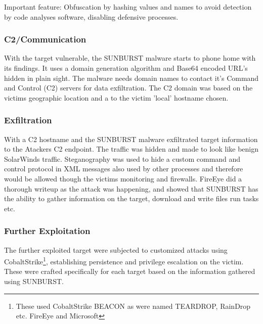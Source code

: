 \documentclass[
	letterpaper, %
	10pt, %
	unnumberedsections, %
	twoside, %
]{LTJournalArticle}
\begin{document}
Important feature: Obfuscation by hashing values and names to avoid detection by code analyses software, disabling defensive processes.

\subsubsection{C2/Communication}
With the target vulnerable, the SUNBURST malware starts to phone home with its findings. It uses a domain generation algorithm \cite{Mandiant} and Base64 encoded URL's hidden in plain sight. The malware needs domain names to contact it's Command and Control (C2) servers for data exfiltration. The C2 domain was based on the victims geographic location and a to the victim 'local' hostname chosen.  

\subsubsection{Exfiltration}
With a C2 hostname and the SUNBURST malware exfiltrated target information to the Atackers C2 endpoint. The traffic was hidden and made to look like benign SolarWinds traffic. Steganography was used to hide a custom command and control protocol in XML messages also used by other processes and therefore would be allowed though the victims monitoring and firewalls. FireEye did a thorough writeup as the attack was happening\cite{Mandiant}, and showed that SUNBURST has the ability to gather information on the target, download and write files run tasks etc.    

\subsubsection{Further Exploitation}
The further exploited target were subjected to customized attacks using CobaltStrike\footnote{These used CobaltStrike BEACON as were named TEARDROP, RainDrop etc. FireEye and Microsoft\cite{MicrosoftSolarwinds}}, establishing persistence and privilege escalation on the victim. These were crafted specifically for each target based on the information gathered using SUNBURST.     
\end{document}
